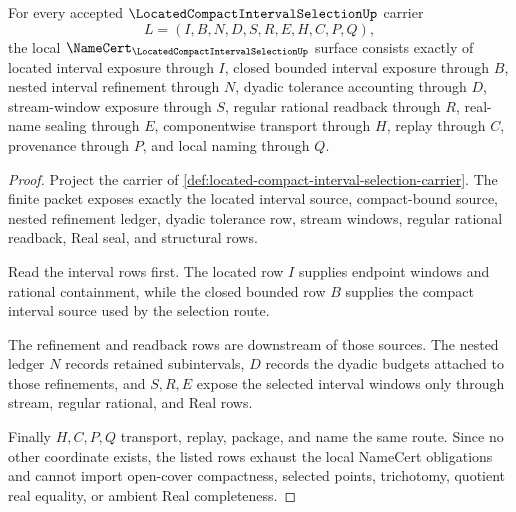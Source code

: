 \begin{theorem}
\label{thm:located-compact-interval-selection-namecert-obligations}
For every accepted $\LocatedCompactIntervalSelectionUp$ carrier
$$
L=(I,B,N,D,S,R,E,H,C,P,Q),
$$
the local $\NameCert_{\LocatedCompactIntervalSelectionUp}$ surface consists exactly of located interval exposure through $I$, closed bounded interval exposure through $B$, nested interval refinement through $N$, dyadic tolerance accounting through $D$, stream-window exposure through $S$, regular rational readback through $R$, real-name sealing through $E$, componentwise transport through $H$, replay through $C$, provenance through $P$, and local naming through $Q$.
\end{theorem}
\begin{proof}
Project the carrier of \autoref{def:located-compact-interval-selection-carrier}. The finite packet exposes exactly the located interval source, compact-bound source, nested refinement ledger, dyadic tolerance row, stream windows, regular rational readback, Real seal, and structural rows.

Read the interval rows first. The located row $I$ supplies endpoint windows and rational containment, while the closed bounded row $B$ supplies the compact interval source used by the selection route.

The refinement and readback rows are downstream of those sources. The nested ledger $N$ records retained subintervals, $D$ records the dyadic budgets attached to those refinements, and $S,R,E$ expose the selected interval windows only through stream, regular rational, and Real rows.

Finally $H,C,P,Q$ transport, replay, package, and name the same route. Since no other coordinate exists, the listed rows exhaust the local NameCert obligations and cannot import open-cover compactness, selected points, trichotomy, quotient real equality, or ambient Real completeness.
\end{proof}

